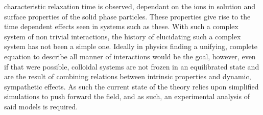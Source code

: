 characteristic relaxation time is observed, dependant on the ions in solution and surface properties of the solid phase particles. %
These properties give rise to the %
time dependent effects seen in systems such as these.
With such a complex system of non trivial interactions, the history of elucidating such a complex system has not been a simple one. Ideally in physics finding a unifying, complete equation to describe all manner of interactions would be the goal, however, even if that were possible, colloidal systems are not frozen in an equilibrated state and are the result of combining relations between intrinsic properties and dynamic, sympathetic effects. As such the current state of the theory relies upon simplified simulations to push forward the field, and as such, an experimental analysis %
 of said models is required. \cite{FoundColloidBook}\cite{IsGreenBook}

